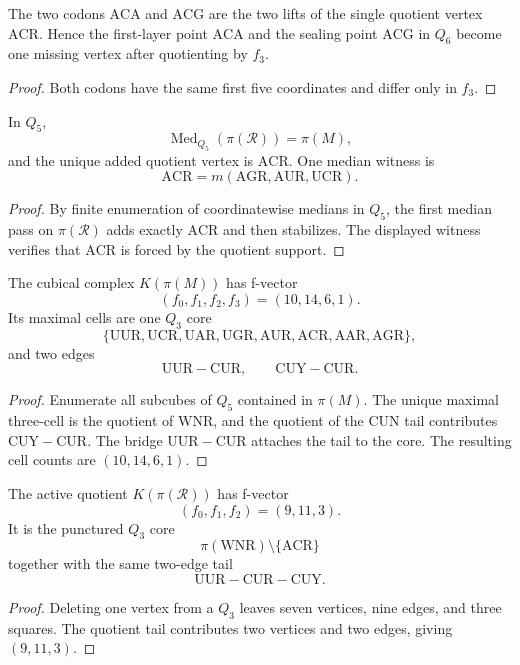 \begin{corollary}
\label{cor:philosophy-thr-pair-quotient-hole}
The two codons $\mathrm{ACA}$ and $\mathrm{ACG}$ are the two lifts of
the single quotient vertex $\mathrm{ACR}$. Hence the first-layer point
$\mathrm{ACA}$ and the sealing point $\mathrm{ACG}$ in $Q_{6}$ become
one missing vertex after quotienting by $f_{3}$.
\end{corollary}
\begin{proof}
Both codons have the same first five coordinates and differ only in
$f_{3}$.
\end{proof}

\begin{theorem}
\label{thm:philosophy-one-step-quotient-median-closure}
In $Q_{5}$,
$$
  \operatorname{Med}_{Q_{5}}(\pi(\mathcal{R}))=\pi(M),
$$
and the unique added quotient vertex is $\mathrm{ACR}$. One median
witness is
$$
  \mathrm{ACR}=m(\mathrm{AGR},\mathrm{AUR},\mathrm{UCR}).
$$
\end{theorem}
\begin{proof}
By finite enumeration of coordinatewise medians in $Q_{5}$, the first
median pass on $\pi(\mathcal{R})$ adds exactly $\mathrm{ACR}$ and then
stabilizes. The displayed witness verifies that $\mathrm{ACR}$ is
forced by the quotient support.
\end{proof}

\begin{theorem}
\label{thm:philosophy-quotient-cubical-skeleton}
The cubical complex $K(\pi(M))$ has f-vector
$$
  (f_{0},f_{1},f_{2},f_{3})=(10,14,6,1).
$$
Its maximal cells are one $Q_{3}$ core
$$
  \{\mathrm{UUR},\mathrm{UCR},\mathrm{UAR},\mathrm{UGR},
    \mathrm{AUR},\mathrm{ACR},\mathrm{AAR},\mathrm{AGR}\},
$$
and two edges
$$
  \mathrm{UUR}-\mathrm{CUR},
  \qquad
  \mathrm{CUY}-\mathrm{CUR}.
$$
\end{theorem}
\begin{proof}
Enumerate all subcubes of $Q_{5}$ contained in $\pi(M)$. The unique
maximal three-cell is the quotient of $\mathrm{WNR}$, and the quotient
of the $\mathrm{CUN}$ tail contributes $\mathrm{CUY}-\mathrm{CUR}$.
The bridge $\mathrm{UUR}-\mathrm{CUR}$ attaches the tail to the core.
The resulting cell counts are $(10,14,6,1)$.
\end{proof}

\begin{theorem}
\label{thm:philosophy-punctured-quotient-skeleton}
The active quotient $K(\pi(\mathcal{R}))$ has f-vector
$$
  (f_{0},f_{1},f_{2})=(9,11,3).
$$
It is the punctured $Q_{3}$ core
$$
  \pi(\mathrm{WNR})\setminus\{\mathrm{ACR}\}
$$
together with the same two-edge tail
$$
  \mathrm{UUR}-\mathrm{CUR}-\mathrm{CUY}.
$$
\end{theorem}
\begin{proof}
Deleting one vertex from a $Q_{3}$ leaves seven vertices, nine edges,
and three squares. The quotient tail contributes two vertices and two
edges, giving $(9,11,3)$.
\end{proof}

